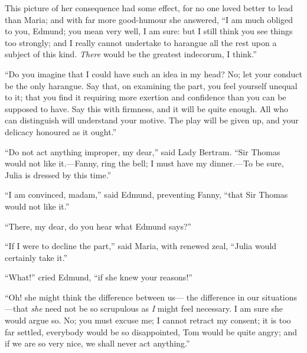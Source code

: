 \documentclass{article}
\begin{document}
This picture of her consequence had some effect, for no
one loved better to lead than Maria; and with far more
good-humour she answered, ``I am much obliged to you, Edmund;
you mean very well, I am sure:  but I still think you
see things too strongly; and I really cannot undertake
to harangue all the rest upon a subject of this kind.
\emph{There} would be the greatest indecorum, I think.''

``Do you imagine that I could have such an idea in
my head?  No; let your conduct be the only harangue.
Say that, on examining the part, you feel yourself
unequal to it; that you find it requiring more exertion
and confidence than you can be supposed to have.
Say this with firmness, and it will be quite enough.
All who can distinguish will understand your motive.
The play will be given up, and your delicacy honoured as
it ought.''

``Do not act anything improper, my dear,'' said Lady Bertram.
``Sir Thomas would not like it.---Fanny, ring the bell;
I must have my dinner.---To be sure, Julia is dressed by
this time.''

``I am convinced, madam,'' said Edmund, preventing Fanny,
``that Sir Thomas would not like it.''

``There, my dear, do you hear what Edmund says?''

``If I were to decline the part,'' said Maria,
with renewed zeal, ``Julia would certainly take it.''

``What!'' cried Edmund, ``if she knew your reasons!''

``Oh! she might think the difference between us---%
the difference in our situations---that \emph{she} need
not be so scrupulous as \emph{I} might feel necessary.
I am sure she would argue so.  No; you must excuse me;
I cannot retract my consent; it is too far settled,
everybody would be so disappointed, Tom would be quite angry;
and if we are so very nice, we shall never act anything.''
\end{document}
